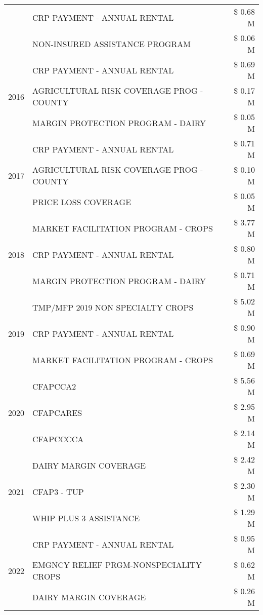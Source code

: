 \begin{tabular}{llr}
 & CRP PAYMENT - ANNUAL RENTAL & \$ 0.68 M \\
 & NON-INSURED ASSISTANCE PROGRAM & \$ 0.06 M \\
\cline{1-3}
\multirow[t]{3}{*}{2016} & CRP PAYMENT - ANNUAL RENTAL & \$ 0.69 M \\
 & AGRICULTURAL RISK COVERAGE PROG - COUNTY & \$ 0.17 M \\
 & MARGIN PROTECTION PROGRAM - DAIRY & \$ 0.05 M \\
\cline{1-3}
\multirow[t]{3}{*}{2017} & CRP PAYMENT - ANNUAL RENTAL & \$ 0.71 M \\
 & AGRICULTURAL RISK COVERAGE PROG - COUNTY & \$ 0.10 M \\
 & PRICE LOSS COVERAGE & \$ 0.05 M \\
\cline{1-3}
\multirow[t]{3}{*}{2018} & MARKET FACILITATION PROGRAM - CROPS & \$ 3.77 M \\
 & CRP PAYMENT - ANNUAL RENTAL & \$ 0.80 M \\
 & MARGIN PROTECTION PROGRAM - DAIRY & \$ 0.71 M \\
\cline{1-3}
\multirow[t]{3}{*}{2019} & TMP/MFP 2019 NON SPECIALTY CROPS & \$ 5.02 M \\
 & CRP PAYMENT - ANNUAL RENTAL & \$ 0.90 M \\
 & MARKET FACILITATION PROGRAM - CROPS & \$ 0.69 M \\
\cline{1-3}
\multirow[t]{3}{*}{2020} & CFAPCCA2 & \$ 5.56 M \\
 & CFAPCARES & \$ 2.95 M \\
 & CFAPCCCCA & \$ 2.14 M \\
\cline{1-3}
\multirow[t]{3}{*}{2021} & DAIRY MARGIN COVERAGE & \$ 2.42 M \\
 & CFAP3 - TUP & \$ 2.30 M \\
 & WHIP PLUS 3 ASSISTANCE & \$ 1.29 M \\
\cline{1-3}
\multirow[t]{3}{*}{2022} & CRP PAYMENT - ANNUAL RENTAL & \$ 0.95 M \\
 & EMGNCY RELIEF PRGM-NONSPECIALITY CROPS & \$ 0.62 M \\
 & DAIRY MARGIN COVERAGE & \$ 0.26 M \\
\cline{1-3}
\bottomrule
\end{tabular}
